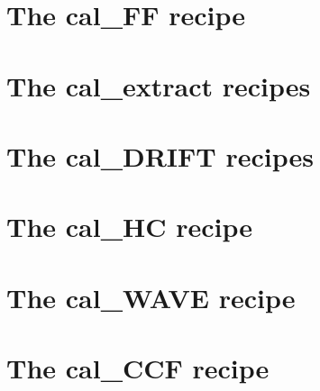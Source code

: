\clearpage
\newpage
\section{The cal\_FF recipe}
\label{ch:the_recipes:cal_FF_RAW_spirou}




\clearpage
\newpage
\section{The cal\_extract recipes}
\label{ch:the_recipes:cal_extract_RAW_spirou}







\clearpage
\newpage
\section{The cal\_DRIFT recipes}
\label{ch:the_recipes:cal_DRIFT_RAW_spirou}




\clearpage
\newpage
\section{The cal\_HC recipe}
\label{ch:the_recipes:cal_HC_E2DS_spirou}



\clearpage
\newpage
\section{The cal\_WAVE recipe}
\label{ch:the_recipes:cal_WAVE_E2DS_spirou}



\clearpage
\newpage
\section{The cal\_CCF recipe}
\label{ch:the_recipes:cal_CCF_E2DS_spirou}


